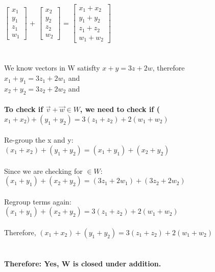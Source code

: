 \documentclass{article}
\begin{document}
{$\left[\begin{matrix}x_{1}\\y_{1}\\z{_1}\\w_{1}\end{matrix}\right]$ + $\left[\begin{matrix}x_{2}\\y_{2}\\z{_2}\\w_{2}\end{matrix}\right]$ = $\left[\begin{matrix}x_{1} + x_{2}\\y_{1} + y_{2}\\z_{1} + z{_2}\\w_{1} + w_{2}\end{matrix}\right]$\\
\\
\\
We know vectors in W satisfty $x+y = 3z+2w$, therefore\\
$x_{1}+y_{1} = 3z_{1}+2w_{1}$ and \\
$x_{2}+y_{2} = 3z_{2}+2w_{2}$ and \\
\\
\textbf{To check if $\vec{v} + \vec{w} \in W$, we need to check if ($x_{1} + x_{2}) + (y_{1} + y_{2}) = 3(z_{1} + z{_2}) + 2(w_{1} + w_{2})$}\\
\\
Re-group the x and y:\\
$ (x_{1} + x_{2}) + ( y_{1} + y_{2})  = (x_{1} + y_{1}) + (x_{2} + y_{2})$\\
\\
Since we are checking for $\in W$:\\
$(x_{1} + y_{1}) + (x_{2} + y_{2}) =  (3z_{1}+2w_{1}) + (3z_{2}+2w_{2})$\\
\\
Regroup terms again:
\\
$(x_{1} + y_{1}) + (x_{2} + y_{2}) =  3(z_{1}+z_{2}) + 2(w_{1} + w_{2})$\\
\\
Therefore,  $(x_{1} + x_{2}) + ( y_{1} + y_{2}) = 3(z_{1}+z_{2}) + 2(w_{1} + w_{2})$\\
\\
\\
\textbf{Therefore: Yes, W is closed under addition.}\\
\\\\\\
}
\end{document}
